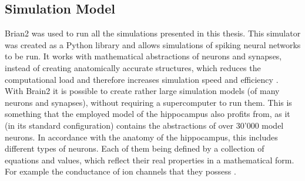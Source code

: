     \subsection{Simulation Model} %
    Brian2 was used to run all the simulations presented in this thesis. This simulator was created as a Python library and allows simulations of spiking neural networks to be run. It works with mathematical abstractions of neurons and synapses, instead of creating anatomically accurate structures, which reduces the computational load and therefore increases simulation speed and efficiency \cite{Brian2}. \\
    With Brain2 it is possible to create rather large simulation models (of many neurons and synapses), without requiring a supercomputer to run them. This is something that the employed model of the hippocampus also profits from, as it (in its standard configuration) contains the abstractions of over 30'000 model neurons. In accordance with the anatomy of the hippocampus, this includes different types of neurons. Each of them being defined by a collection of equations and values, which reflect their real properties in a mathematical form. For example the conductance of ion channels that they possess \cite{Aussel.2018}.
    
